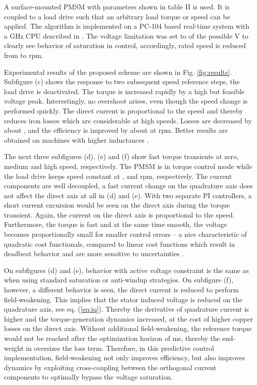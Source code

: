 \documentclass[a4paper,11pt,fleqn]{article}
\begin{document}
A surface-mounted PMSM with parameters shown in table II is used. It is coupled to a load drive such that an arbitrary load torque or speed can be applied. The algorithm is implemented on a PC-104 based real-time system with a  GHz CPU described in \cite{Nael}. The voltage limitation was set to  of the possible  V to clearly see behavior of saturation in control, accordingly, rated speed is reduced from  to  rpm.

Experimental results of the proposed scheme are shown in Fig. \ref{fig:results}. Subfigure (c) shows the response to two subsequent speed reference steps, the load drive is deactivated. The torque is increased rapidly by a high but feasible voltage peak. Interestingly, no overshoot arises, even though the speed change is performed quickly. The direct current is proportional to the speed and thereby reduces iron losses which are considerable at high speeds. Losses are decreased by about , and the efficiency is improved by about  at  rpm. Better results are obtained on machines with higher inductances \cite{PMSMeff}.

The next three subfigures (d), (e) and (f) show fast torque transients at zero, medium and high speed, respectively. The PMSM is in torque control mode while the load drive keeps speed constant at ,  and  rpm, respectively. The current components are well decoupled, a fast current change on the quadrature axis does not affect the direct axis at all in (d) and (e). With two separate PI controllers, a short current excursion would be seen on the direct axis during the torque transient. Again, the current on the direct axis  is proportional to the speed. Furthermore, the torque is fast and at the same time smooth, the voltage becomes proportionally small for smaller control errors -- a nice characteristic of quadratic cost functionals, compared to linear cost functions which result in deadbeat behavior and are more sensitive to uncertainties \cite{Moon}. 

On subfigures (d) and (e), behavior with active voltage constraint is the same as when using standard saturation or anti-windup strategies. On subfigure (f), however, a different behavior is seen, the direct current  is reduced to perform field-weakening. This implies that the stator induced voltage is reduced on the quadrature axis, see eq. (\ref{eq:iq}). Thereby the derivative of quadrature current  is higher and the torque-generation dynamics increased, at the cost of higher copper losses on the direct axis. Without additional field-weakening, the reference torque would not be reached after the optimization horizon of  ms, thereby the end-weight in  oversizes the loss term. Therefore, in this predictive control implementation, field-weakening not only improves efficiency, but also improves dynamics by exploiting cross-coupling between the orthogonal current components to optimally bypass the voltage saturation. 
\end{document}
